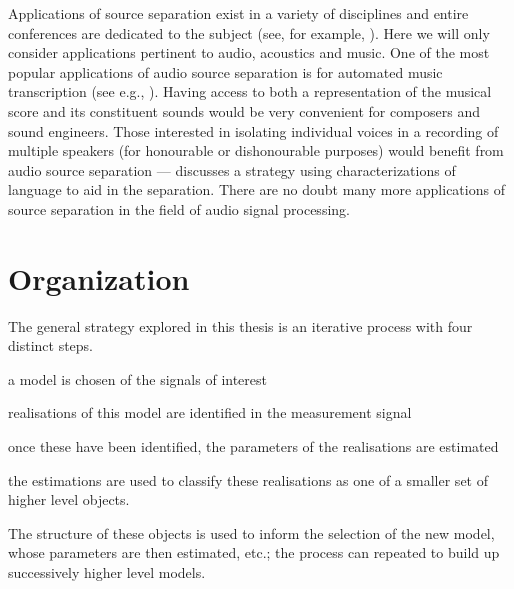 Applications of source separation exist in a variety of disciplines and entire
conferences are dedicated to the subject (see, for example,
\cite{zarzoso2010latent}).  Here we will only consider applications pertinent to
audio, acoustics and music. One of the most popular applications of audio source
separation is for automated music transcription (see e.g.,
\cite{bertin2010enforcing}). Having access to both a representation of the
musical score and its constituent sounds would be very convenient for composers
and sound engineers. Those interested in isolating individual voices in a
recording of multiple speakers (for honourable or dishonourable purposes) would
benefit from audio source separation --- \cite{mysore2012non} discusses a
strategy using characterizations of language to aid in the separation. There are
no doubt many more applications of source separation in the field of audio
signal processing.

\section{Organization}

The general strategy explored in this thesis is an iterative process with four
distinct steps.
\begin{enumerate*}[label=(\arabic*),itemjoin={{. }}]
\item a model is chosen of the signals of interest
\item realisations of this model are
identified in the measurement signal
\item once these have been identified, the parameters
of the realisations are estimated
\item the estimations are used to classify these
realisations as one of a smaller set of higher level objects.
\end{enumerate*}
The structure of these objects is used to inform the selection of the new model,
whose parameters are then estimated, etc.; the process can repeated to build
up successively higher level models.

